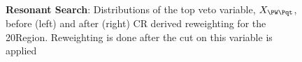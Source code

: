 {	\begin{figure}[ht]
	    \centering
	    \caption{\textbf{Resonant Search}: Distributions of the top veto variable, $X_{\PW\Pqt}$, before (left) and after (right) CR derived reweighting for the 20\yr\space \region\space Region. Reweighting is done after the cut on this variable is applied
	    \label{fig:res-\region\yr-8}}
	\end{figure}
}
